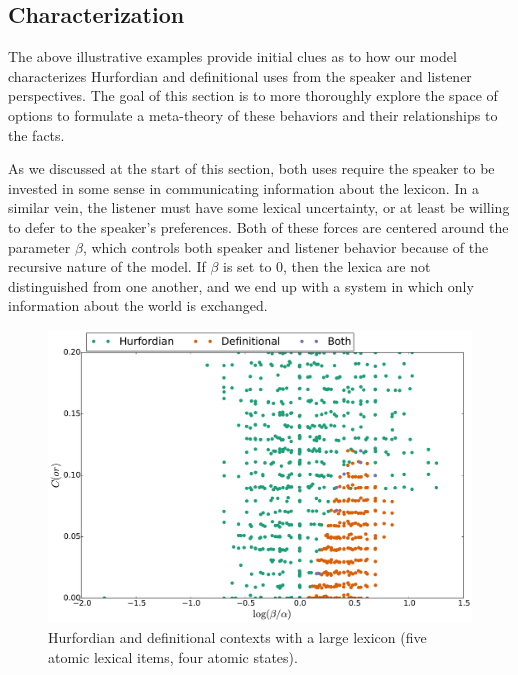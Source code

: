 \documentclass{article}
\begin{document}

\subsection{Characterization}\label{sec:analysis:characterization}

The above illustrative examples provide initial clues as to how our
model characterizes Hurfordian and definitional uses from the speaker
and listener perspectives. The goal of this section is to more
thoroughly explore the space of options to formulate a meta-theory of
these behaviors and their relationships to the facts.

As we discussed at the start of this section, both uses require the
speaker to be invested in some sense in communicating information
about the lexicon.  In a similar vein, the listener must have some
lexical uncertainty, or at least be willing to defer to the speaker's
preferences. Both of these forces are centered around the parameter
$\beta$, which controls both speaker and listener behavior because of
the recursive nature of the model. If $\beta$ is set to $0$, then the
lexica are not distinguished from one another, and we end up with a
system in which only information about the world is exchanged.

\begin{figure}[tp]
  \centering
  \includegraphics[width=1\textwidth]{fig/paramexplore-lex5}
  \caption{Hurfordian and definitional contexts with a large lexicon
    (five atomic lexical items, four atomic states).}
  \label{fig:char}
\end{figure}
\end{document}
